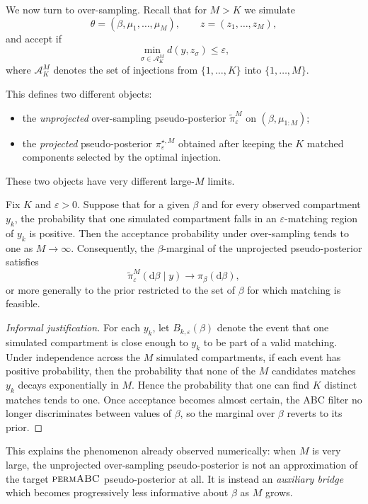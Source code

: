 We now turn to over-sampling. Recall that for $M > K$ we simulate
\[
  \theta = (\beta,\mu_1,\dots,\mu_M),
  \qquad
  z=(z_1,\dots,z_M),
\]
and accept if
\[
  \min_{\sigma\in \mathcal A_K^M} d(y,z_\sigma) \le \varepsilon,
\]
where $\mathcal A_K^M$ denotes the set of injections from $\{1,\dots,K\}$ into
$\{1,\dots,M\}$.

This defines two different objects:
\begin{itemize}
  \item the \emph{unprojected} over-sampling pseudo-posterior $\tilde\pi^{M}_{\varepsilon}$ on
  $(\beta,\mu_{1:M})$;
  \item the \emph{projected} pseudo-posterior $\pi^{\star,M}_{\varepsilon}$ obtained after keeping the
  $K$ matched components selected by the optimal injection.
\end{itemize}
These two objects have very different large-$M$ limits.

\begin{proposition}
Fix $K$ and $\varepsilon>0$. Suppose that for a given $\beta$ and for every observed compartment
$y_k$, the probability that one simulated compartment falls in an $\varepsilon$-matching region of
$y_k$ is positive. Then the acceptance probability under over-sampling tends to one as
$M\to\infty$. Consequently, the $\beta$-marginal of the unprojected pseudo-posterior satisfies
\[
  \tilde\pi^{M}_{\varepsilon}(\mathrm d\beta\mid y)
  \longrightarrow
  \pi_\beta(\mathrm d\beta),
\]
or more generally to the prior restricted to the set of $\beta$ for which matching is feasible.
\end{proposition}

\begin{proof}[Informal justification]
For each $y_k$, let $B_{k,\varepsilon}(\beta)$ denote the event that one simulated compartment is
close enough to $y_k$ to be part of a valid matching. Under independence across the $M$
simulated compartments, if each event has positive probability, then the probability that none of
the $M$ candidates matches $y_k$ decays exponentially in $M$. Hence the probability that one can
find $K$ distinct matches tends to one. Once acceptance becomes almost certain, the ABC filter
no longer discriminates between values of $\beta$, so the marginal over $\beta$ reverts to its prior.
\end{proof}

This explains the phenomenon already observed numerically: when $M$ is very large, the
unprojected over-sampling pseudo-posterior is not an approximation of the target
$\textsc{permABC}$ pseudo-posterior at all. It is instead an \emph{auxiliary bridge} which becomes
progressively less informative about $\beta$ as $M$ grows.

